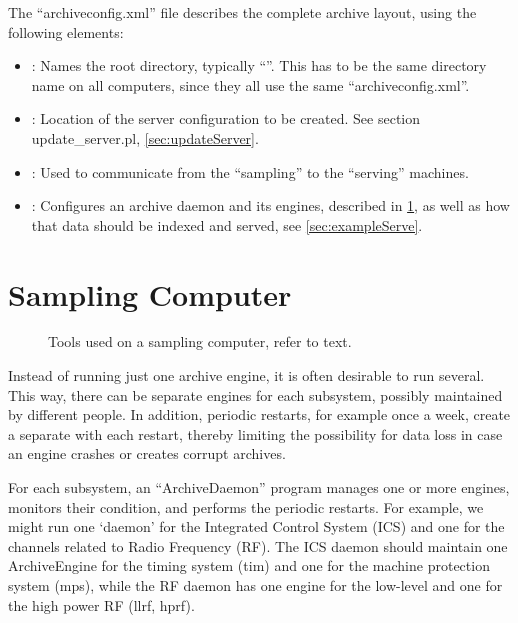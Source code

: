 

\clearpage

\noindent The ``archiveconfig.xml'' file describes the complete archive layout,
using the following elements:
\begin{itemize}
\item {}: Names the root directory, typically ``''.
      This has to be the same directory name on all computers,
      since they all use the same ``archiveconfig.xml''.
\item {}: Location of the server configuration to be
      created. See section update\_server.pl, \ref{sec:updateServer}.
\item {}: Used to communicate from the ``sampling'' to the
      ``serving'' machines.
\item {}: Configures an archive daemon and its engines,
      described in \ref{sec:exampleSample},
      as well as how that data should be indexed and served,
      see \ref{sec:exampleServe}.
\end{itemize}

\section{Sampling Computer} \label{sec:exampleSample}
\begin{figure}[htb]
\begin{center}
\end{center}
\caption{\label{fig:acSample}Tools used on a sampling computer, refer to text.}
\end{figure}

\noindent Instead of running just one archive engine, it is often desirable to
run several. This way, there can be separate engines for each
subsystem, possibly maintained by different people.  In addition,
periodic restarts, for example once a week, create a separate
 with each restart, thereby limiting the
possibility for data loss in case an engine crashes or creates corrupt
archives.

For each subsystem, an ``ArchiveDaemon'' program manages one or more
engines, monitors their condition, and performs the periodic restarts.
For example, we might run one `daemon' for the Integrated Control
System (ICS) and one for the channels related to Radio Frequency (RF).
The ICS daemon should maintain one ArchiveEngine for the timing system
(tim) and one for the machine protection system (mps), while the RF
daemon has one engine for the low-level and one for the high power RF
(llrf, hprf).


